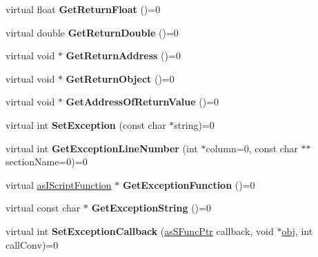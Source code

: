 \begin{DoxyCompactItemize}
virtual float {\bfseries Get\+Return\+Float} ()=0
\item 
\mbox{\label{classas_i_script_context_a7e1ce03637cd5dd48ea652fdf7913bd7}} 
virtual double {\bfseries Get\+Return\+Double} ()=0
\item 
\mbox{\label{classas_i_script_context_a2438a7fcf46faa2267bdb94057cd1f2e}} 
virtual void $\ast$ {\bfseries Get\+Return\+Address} ()=0
\item 
\mbox{\label{classas_i_script_context_a6d5739fac9c90bcd0fea55d01841d43a}} 
virtual void $\ast$ {\bfseries Get\+Return\+Object} ()=0
\item 
\mbox{\label{classas_i_script_context_a889bf11123beba669637849c8e9b2b86}} 
virtual void $\ast$ {\bfseries Get\+Address\+Of\+Return\+Value} ()=0
\item 
\mbox{\label{classas_i_script_context_a4ed608208cafdebe5676df079e27d392}} 
virtual int {\bfseries Set\+Exception} (const char $\ast$string)=0
\item 
\mbox{\label{classas_i_script_context_a22e3c351fe6b13ba0a62010dfc305080}} 
virtual int {\bfseries Get\+Exception\+Line\+Number} (int $\ast$column=0, const char $\ast$$\ast$section\+Name=0)=0
\item 
\mbox{\label{classas_i_script_context_a8e59aceec42080d29e08b44460ceb8b3}} 
virtual \hyperlink{classas_i_script_function}{as\+I\+Script\+Function} $\ast$ {\bfseries Get\+Exception\+Function} ()=0
\item 
\mbox{\label{classas_i_script_context_a46e2411bc84e99f57e7d9fe2374bb479}} 
virtual const char $\ast$ {\bfseries Get\+Exception\+String} ()=0
\item 
\mbox{\label{classas_i_script_context_a4d1f481473df3f7aefccc5bb6904e405}} 
virtual int {\bfseries Set\+Exception\+Callback} (\hyperlink{structas_s_func_ptr}{as\+S\+Func\+Ptr} callback, void $\ast$\hyperlink{structobj}{obj}, int call\+Conv)=0
\item 
$$
\end{DoxyCompactItemize}
